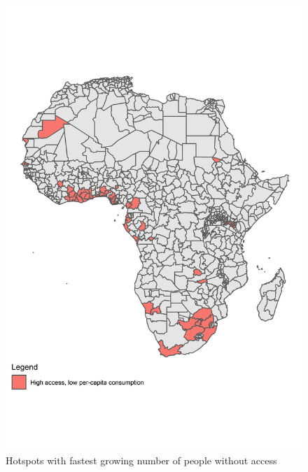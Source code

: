 \documentclass[preprint,12pt]{elsarticle}
\begin{document}
\begin{figure}[H]
    \centering
    \includegraphics{figures/highaccesslowconsumption.png}
    \caption{Hotspots with fastest growing number of people without access}
    \label{map2}
\end{figure}
\end{document}
